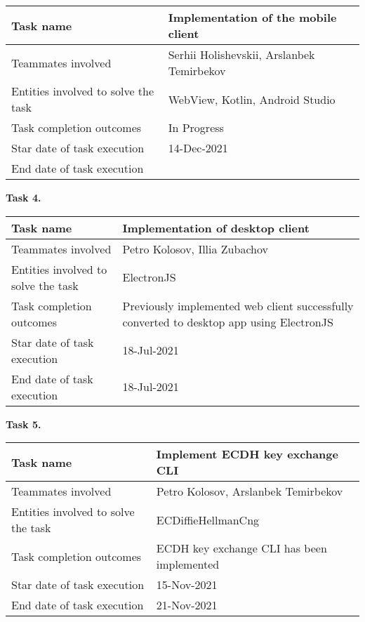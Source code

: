 \begin{tabular}{|p{}|p{}|}
    \hline
    Task name                           & Implementation of the mobile client       \\
    \hline
    Teammates involved                  & Serhii Holishevskii, Arslanbek Temirbekov \\
    \hline
    Entities involved to solve the task & WebView, Kotlin, Android Studio           \\
    \hline
    Task completion outcomes            & In Progress                               \\
    \hline
    Star date of task execution         & 14-Dec-2021                               \\
    \hline
    End date of task execution          &                                           \\
    \hline
\end{tabular}
\vskip 5mm
\hspace*{-6mm}\textbf{Task 4.}\\
\begin{tabular}{|p{}|p{}|}
    \hline
    Task name                           & Implementation of desktop client \\
    \hline
    Teammates involved                  & Petro Kolosov, Illia Zubachov    \\
    \hline
    Entities involved to solve the task & ElectronJS                       \\
    \hline
    Task completion outcomes & Previously implemented web client successfully converted to
    desktop app using ElectronJS \\
    \hline
    Star date of task execution         & 18-Jul-2021                      \\
    \hline
    End date of task execution          & 18-Jul-2021                      \\
    \hline
\end{tabular}
\vskip 5mm
\hspace*{-6mm}\textbf{Task 5.}\\
\begin{tabular}{|p{}|p{}|}
    \hline
    Task name                           & Implement ECDH key exchange CLI            \\
    \hline
    Teammates involved                  & Petro Kolosov, Arslanbek Temirbekov        \\
    \hline
    Entities involved to solve the task & ECDiffieHellmanCng                         \\
    \hline
    Task completion outcomes            & ECDH key exchange CLI has been implemented \\
    \hline
    Star date of task execution         & 15-Nov-2021                                \\
    \hline
    End date of task execution          & 21-Nov-2021                                \\
    \hline
\end{tabular}